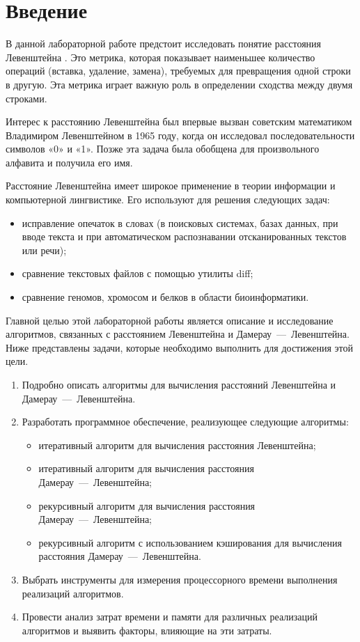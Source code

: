 \chapter*{Введение}

В данной лабораторной работе предстоит исследовать понятие расстояния Левенштейна \cite{levenshtein}. 
Это метрика, которая показывает наименьшее количество операций (вставка, удаление, замена), требуемых для превращения одной строки в другую. 
Эта метрика играет важную роль в определении сходства между двумя строками.

Интерес к расстоянию Левенштейна был впервые вызван советским математиком Владимиром Левенштейном в 1965 году, когда он исследовал последовательности символов «0» и «1». 
Позже эта задача была обобщена для произвольного алфавита и получила его имя.

Расстояние Левенштейна имеет широкое применение в теории информации и компьютерной лингвистике. 
Его используют для решения следующих задач:
\begin{itemize}[label=---]
\item исправление опечаток в словах (в поисковых системах, базах данных, при вводе текста и при автоматическом распознавании отсканированных текстов или речи);
\item сравнение текстовых файлов с помощью утилиты diff;
\item сравнение геномов, хромосом и белков в области биоинформатики.
\end{itemize}

Главной целью этой лабораторной работы является описание и исследование алгоритмов, связанных с расстоянием Левенштейна и Дамерау~---~Левенштейна.
Ниже представлены задачи, которые необходимо выполнить для достижения этой цели.
\begin{enumerate}[label={\arabic*)}]
\item Подробно описать алгоритмы для вычисления расстояний Левенштейна и Дамерау~---~Левенштейна.
\item Разработать программное обеспечение, реализующее следующие алгоритмы:
\begin{itemize}[label=---]
\item итеративный алгоритм для вычисления расстояния Левенштейна;
\item итеративный алгоритм для вычисления расстояния Дамерау~---~Левенштейна;
\item рекурсивный алгоритм для вычисления расстояния Дамерау~---~Левенштейна;
\item рекурсивный алгоритм с использованием кэширования для вычисления расстояния Дамерау~---~Левенштейна.
\end{itemize}
\item Выбрать инструменты для измерения процессорного времени выполнения реализаций алгоритмов.
\item Провести анализ затрат времени и памяти для различных реализаций алгоритмов и выявить факторы, влияющие на эти затраты.
\end{enumerate}